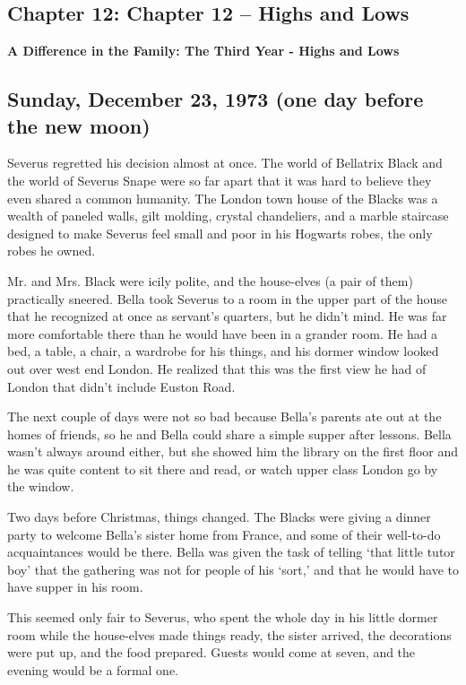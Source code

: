 \documentclass[a4paper,11pt]{article}
\begin{document}
\subsection{Chapter 12: Chapter 12 – Highs and Lows}

\textbf{A Difference in the Family: The Third Year - Highs and Lows}

\subsection{Sunday, December 23, 1973 (one day before the new moon)}

Severus regretted his decision almost at once. The world of Bellatrix Black and the world of Severus Snape were so far apart that it was hard to believe they even shared a common humanity. The London town house of the Blacks was a wealth of paneled walls, gilt molding, crystal chandeliers, and a marble staircase designed to make Severus feel small and poor in his Hogwarts robes, the only robes he owned.

Mr. and Mrs. Black were icily polite, and the house-elves (a pair of them) practically sneered. Bella took Severus to a room in the upper part of the house that he recognized at once as servant's quarters, but he didn't mind. He was far more comfortable there than he would have been in a grander room. He had a bed, a table, a chair, a wardrobe for his things, and his dormer window looked out over west end London. He realized that this was the first view he had of London that didn't include Euston Road.

The next couple of days were not so bad because Bella's parents ate out at the homes of friends, so he and Bella could share a simple supper after lessons. Bella wasn't always around either, but she showed him the library on the first floor and he was quite content to sit there and read, or watch upper class London go by the window.

Two days before Christmas, things changed. The Blacks were giving a dinner party to welcome Bella's sister home from France, and some of their well-to-do acquaintances would be there. Bella was given the task of telling `that little tutor boy' that the gathering was not for people of his `sort,' and that he would have to have supper in his room.

This seemed only fair to Severus, who spent the whole day in his little dormer room while the house-elves made things ready, the sister arrived, the decorations were put up, and the food prepared. Guests would come at seven, and the evening would be a formal one.
\end{document}
